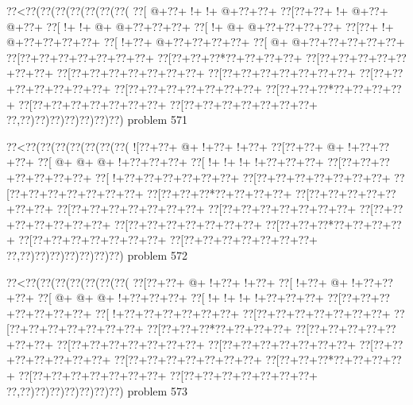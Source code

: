 \vbox{\vbox{\goo
\0??<\0??(\0??(\0??(\0??(\0??(\0??(\0??(
\0??[\- @+\0??+\- !+\- !+\- @+\0??+\0??+
\0??[\0??+\0??+\- !+\- @+\0??+\- @+\0??+
\0??[\- !+\- !+\- @+\- @+\0??+\0??+\0??+
\0??[\- !+\- @+\- @+\0??+\0??+\0??+\0??+
\0??[\0??+\- !+\- @+\0??+\0??+\0??+\0??+
\0??[\- !+\0??+\- @+\0??+\0??+\0??+\0??+
\0??[\- @+\- @+\0??+\0??+\0??+\0??+\0??+
\0??[\0??+\0??+\0??+\0??+\0??+\0??+\0??+
\0??[\0??+\0??+\0??*\0??+\0??+\0??+\0??+
\0??[\0??+\0??+\0??+\0??+\0??+\0??+\0??+
\0??[\0??+\0??+\0??+\0??+\0??+\0??+\0??+
\0??[\0??+\0??+\0??+\0??+\0??+\0??+\0??+
\0??[\0??+\0??+\0??+\0??+\0??+\0??+\0??+
\0??[\0??+\0??+\0??+\0??+\0??+\0??+\0??+
\0??[\0??+\0??+\0??*\0??+\0??+\0??+\0??+
\0??[\0??+\0??+\0??+\0??+\0??+\0??+\0??+
\0??[\0??+\0??+\0??+\0??+\0??+\0??+\0??+
\0??,\0??)\0??)\0??)\0??)\0??)\0??)\0??)
}
\hfil problem 571\hfil\break
}

\vbox{\vbox{\goo
\0??<\0??(\0??(\0??(\0??(\0??(\0??(\0??(
\- ![\0??+\0??+\- @+\- !+\0??+\- !+\0??+
\0??[\0??+\0??+\- @+\- !+\0??+\0??+\0??+
\0??[\- @+\- @+\- @+\- !+\0??+\0??+\0??+
\0??[\- !+\- !+\- !+\- !+\0??+\0??+\0??+
\0??[\0??+\0??+\0??+\0??+\0??+\0??+\0??+
\0??[\- !+\0??+\0??+\0??+\0??+\0??+\0??+
\0??[\0??+\0??+\0??+\0??+\0??+\0??+\0??+
\0??[\0??+\0??+\0??+\0??+\0??+\0??+\0??+
\0??[\0??+\0??+\0??*\0??+\0??+\0??+\0??+
\0??[\0??+\0??+\0??+\0??+\0??+\0??+\0??+
\0??[\0??+\0??+\0??+\0??+\0??+\0??+\0??+
\0??[\0??+\0??+\0??+\0??+\0??+\0??+\0??+
\0??[\0??+\0??+\0??+\0??+\0??+\0??+\0??+
\0??[\0??+\0??+\0??+\0??+\0??+\0??+\0??+
\0??[\0??+\0??+\0??*\0??+\0??+\0??+\0??+
\0??[\0??+\0??+\0??+\0??+\0??+\0??+\0??+
\0??[\0??+\0??+\0??+\0??+\0??+\0??+\0??+
\0??,\0??)\0??)\0??)\0??)\0??)\0??)\0??)
}
\hfil problem 572\hfil\break
}

\vbox{\vbox{\goo
\0??<\0??(\0??(\0??(\0??(\0??(\0??(\0??(
\0??[\0??+\0??+\- @+\- !+\0??+\- !+\0??+
\0??[\- !+\0??+\- @+\- !+\0??+\0??+\0??+
\0??[\- @+\- @+\- @+\- !+\0??+\0??+\0??+
\0??[\- !+\- !+\- !+\- !+\0??+\0??+\0??+
\0??[\0??+\0??+\0??+\0??+\0??+\0??+\0??+
\0??[\- !+\0??+\0??+\0??+\0??+\0??+\0??+
\0??[\0??+\0??+\0??+\0??+\0??+\0??+\0??+
\0??[\0??+\0??+\0??+\0??+\0??+\0??+\0??+
\0??[\0??+\0??+\0??*\0??+\0??+\0??+\0??+
\0??[\0??+\0??+\0??+\0??+\0??+\0??+\0??+
\0??[\0??+\0??+\0??+\0??+\0??+\0??+\0??+
\0??[\0??+\0??+\0??+\0??+\0??+\0??+\0??+
\0??[\0??+\0??+\0??+\0??+\0??+\0??+\0??+
\0??[\0??+\0??+\0??+\0??+\0??+\0??+\0??+
\0??[\0??+\0??+\0??*\0??+\0??+\0??+\0??+
\0??[\0??+\0??+\0??+\0??+\0??+\0??+\0??+
\0??[\0??+\0??+\0??+\0??+\0??+\0??+\0??+
\0??,\0??)\0??)\0??)\0??)\0??)\0??)\0??)
}
\hfil problem 573\hfil\break
}

